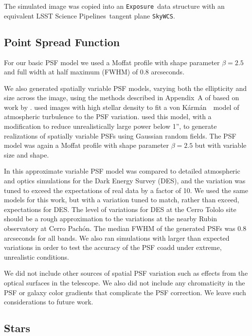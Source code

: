 \documentclass[twocolumn,twocolappendix,astrosym]{openjournal}
\newcommand{\calexp}{\texttt{Exposure}}
\newcommand{\dm}{LSST Science Pipelines}
\newcommand{\vonkarman}{{von K\'arm\'an}~}
\begin{document}
The simulated image was copied into an \calexp\ data structure with an
equivalent \dm\ tangent plane \texttt{SkyWCS}.

\subsection{Point Spread Function} \label{sec:sim:psfs}

For our basic PSF model we used a Moffat profile \citep{Moffat1969} with shape
parameter $\beta=2.5$ and full width at half maximum (FWHM) of 0.8 arcseconds.

We also generated spatially variable PSF models, varying both the ellipticity
and size across the image, using the methods described in Appendix~A of
\citet{mdet20} based on work by \citet{heymans2012}.  \citet{heymans2012} used
images with high stellar density to fit a \vonkarman\ model of atmospheric
turbulence to the PSF variation. \citet{mdet20} used this model, with a
modification to reduce unrealistically large power below 1'', to generate
realizations of spatially variable PSFs using Gaussian random fields. The PSF
model was again a Moffat profile with shape parameter $\beta=2.5$ but with
variable size and shape.

In \citet{mdet20} this approximate variable PSF model was compared to detailed
atmospheric and optics simulations for the Dark Energy Survey (DES), and the
variation was tuned to exceed the expectations of real data by a factor of 10.
We used the same models for this work, but with a variation tuned to match,
rather than exceed, expectations for DES.  The level of variations for DES at
the Cerro Tololo site should be a rough approximation to the variations at the
nearby Rubin observatory at Cerro Pachón.  The median FWHM of the generated
PSFs was 0.8 arcseconds for all bands.  We also ran simulations with larger
than expected variations in order to test the accuracy of the PSF coadd under
extreme, unrealistic conditions.

We did not include other sources of spatial PSF variation such as effects from
the optical surfaces in the telescope.  We also did not include any
chromaticity in the PSF \citep{PlazasPSF2012,MeyersBurchat2015,Kamath2020} or
galaxy color gradients that complicate the PSF correction.  We leave such
considerations to future work.

\subsection{Stars} \label{sec:sim:stars}
\end{document}
